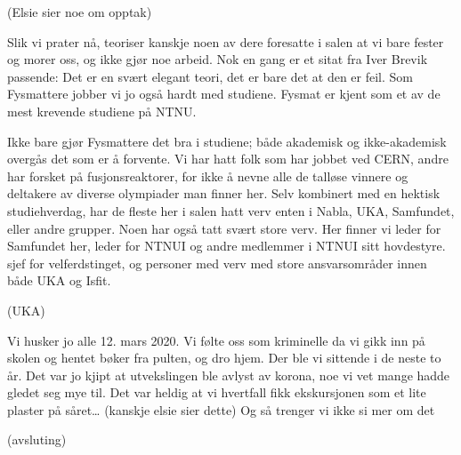 \documentclass[12pt, a4paper]{scrarticle}
\begin{document}
(Elsie sier noe om opptak)

\newpage

Slik vi prater nå, teoriser kanskje noen av dere foresatte i salen at vi bare fester og morer oss, og ikke gjør noe arbeid.
Nok en gang er et sitat fra Iver Brevik passende:
Det er en svært elegant teori, det er bare det at den er feil.
Som Fysmattere jobber vi jo også hardt med studiene.
Fysmat er kjent som et av de mest krevende studiene på NTNU.

Ikke bare gjør Fysmattere det bra i studiene; både akademisk og ikke-akademisk overgås det som er å forvente.
Vi har hatt folk som har jobbet ved CERN, andre har forsket på fusjonsreaktorer, for ikke å nevne alle de talløse vinnere og deltakere av diverse olympiader man finner her.
Selv kombinert med en hektisk studiehverdag, har de fleste her i salen hatt verv enten i Nabla, UKA, Samfundet, eller andre grupper.
Noen har også tatt svært store verv.
Her finner vi leder for Samfundet her, leder for NTNUI og andre medlemmer i NTNUI sitt hovdestyre. sjef for velferdstinget, og personer med verv med store ansvarsområder innen både UKA og Isfit.

(UKA)

Vi husker jo alle 12. mars 2020.
Vi følte oss som kriminelle da vi gikk inn på skolen og hentet bøker fra pulten, og dro hjem.
Der ble vi sittende i de neste to år.
Det var jo kjipt at utvekslingen ble avlyst av korona, noe vi vet mange hadde gledet seg mye til.
Det var heldig at vi hvertfall fikk ekskursjonen som et lite plaster på såret\ldots{} (kanskje elsie sier dette)
Og så trenger vi ikke si mer om det

(avsluting)
\end{document}
